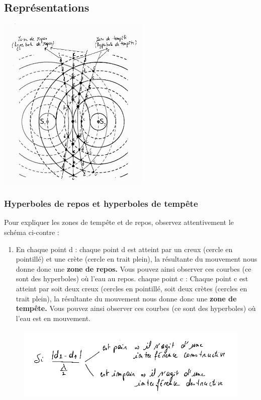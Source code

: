 {\subsection{Représentations}
\includegraphics[width=7.264cm,height=8.423cm]{Pictures/100000010000021B000002719784CD0CAF081F55.png}

\subsubsection{Hyperboles de repos et hyperboles de tempête}

Pour expliquer les zones de tempête et de repos, observez attentivement
le schéma ci-contre :
\begin{enumerate}
	\item En chaque point d : chaque point d est atteint par un creux (cercle en pointillé)
	et une crète (cercle en trait plein), la résultante du
	mouvement nous donne donc une \textbf{zone de repos.} Vous pouvez ainsi
	observer ces courbes (ce sont des hyperboles) où l'eau au repos.
    \itemEn chaque point c : Chaque point c est atteint par soit deux creux (cercles en pointillé, soit deux crètes (cercles en trait plein), la résultante du mouvement nous donne donc une \textbf{zone de tempête.} Vous pouvez ainsi observer ces courbes (ce sont des hyperboles) où l'eau est en mouvement.
\end{enumerate}

\begin{figure}
\centering
\includegraphics[width=13.005cm,height=3.542cm]{Pictures/1000000100000220000000A31734CD7DA5F285B4.png}
\caption{}
\end{figure}

}
